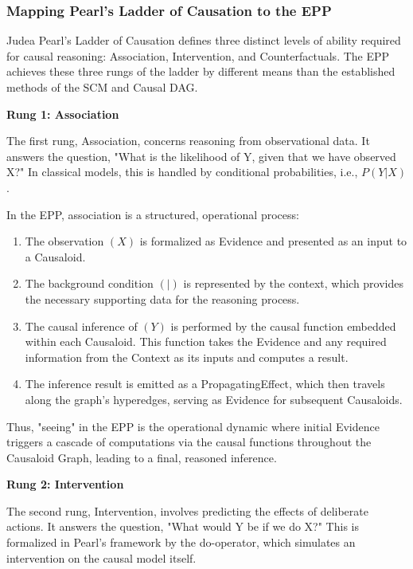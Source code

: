 %
%
\subsubsection{Mapping Pearl's Ladder of Causation to the EPP}
\label{sec:epp_ladder_causation}

Judea Pearl's Ladder of Causation\cite{pearl2000causality} defines three distinct levels of ability required for causal reasoning: Association, Intervention, and Counterfactuals. The EPP achieves these three rungs of the ladder by different means than the established methods of the SCM and Causal DAG.  

\textbf{Rung 1: Association}

The first rung, Association, concerns reasoning from observational data. 
It answers the question, "What is the likelihood of Y, given that we have observed X?" In classical models, this is handled by conditional probabilities, i.e., $P(Y|X)$.

In the EPP, association is a structured, operational process:

\begin{enumerate}
	\item The observation $(X)$ is formalized as Evidence and presented as an input to a Causaloid.
	\item The background condition $(|)$ is represented by the context, which provides the necessary supporting data for the reasoning process.
	\item The causal inference of $(Y)$ is performed by the causal function embedded within each Causaloid. This function takes the Evidence and any required information from the Context as its inputs and computes a result.
	\item The inference result is emitted as a PropagatingEffect, which then travels along the graph's hyperedges, serving as Evidence for subsequent Causaloids.
\end{enumerate}

Thus, "seeing" in the EPP is the operational dynamic where initial Evidence triggers a cascade of computations via the causal functions throughout the Causaloid Graph, leading to a final, reasoned inference.

\textbf{Rung 2: Intervention}

The second rung, Intervention, involves predicting the effects of deliberate actions. It answers the question, "What would Y be if we do X?" This is formalized in Pearl's framework by the do-operator, which simulates an intervention on the causal model itself.

